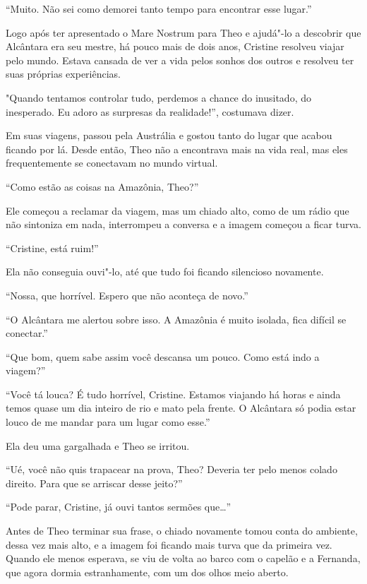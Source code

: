 ``Muito. Não sei como demorei tanto tempo para encontrar esse lugar.''

Logo após ter apresentado o Mare Nostrum para Theo e ajudá"-lo a
descobrir que Alcântara era seu mestre, há pouco mais de dois anos,
Cristine resolveu viajar pelo mundo. Estava cansada de ver a vida
pelos sonhos dos outros e resolveu ter suas próprias experiências.

"Quando tentamos controlar tudo, perdemos a chance do inusitado, do
inesperado. Eu adoro as surpresas da realidade!'', costumava dizer.

Em suas viagens, passou pela Austrália e gostou tanto do lugar que
acabou ficando por lá. Desde então, Theo não a encontrava mais na vida
real, mas eles frequentemente se conectavam no mundo virtual.

``Como estão as coisas na Amazônia, Theo?''

Ele começou a reclamar da viagem, mas um chiado alto, como de um rádio
que não sintoniza em nada, interrompeu a conversa e a imagem começou a
ficar turva.

``Cristine, está ruim!''

Ela não conseguia ouvi"-lo, até que tudo foi ficando silencioso novamente.

``Nossa, que horrível. Espero que não aconteça de novo.''

``O Alcântara me alertou sobre isso. A Amazônia é muito isolada, fica
difícil se conectar.''

``Que bom, quem sabe assim você descansa um pouco. Como está indo a
viagem?''

``Você tá louca? É tudo horrível, Cristine. Estamos viajando há horas e
ainda temos quase um dia inteiro de rio e mato pela frente. O Alcântara
só podia estar louco de me mandar para um lugar como esse.''

Ela deu uma gargalhada e Theo se irritou.

``Ué, você não quis trapacear na prova, Theo? Deveria ter pelo menos
colado direito. Para que se arriscar desse jeito?''

``Pode parar, Cristine, já ouvi tantos sermões que\ldots{}''

Antes de Theo terminar sua frase, o chiado novamente tomou conta do
ambiente, dessa vez mais alto, e a imagem foi ficando mais turva que da
primeira vez. Quando ele menos esperava, se viu de volta ao barco com o
capelão e a Fernanda, que agora dormia estranhamente, com um dos olhos
meio aberto.

\asterisc


